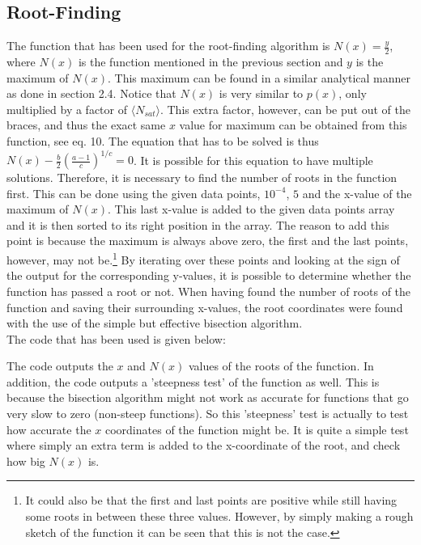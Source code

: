 \subsection{Root-Finding}

The function that has been used for the root-finding algorithm is $N(x) = \frac{y}{2}$, where $N(x)$ is the function mentioned in the previous section and $y$ is the maximum of $N(x)$. This maximum can be found in a similar analytical manner as done in section 2.4. Notice that $N(x)$ is very similar to $p(x)$, only multiplied by a factor of $\langle N_{sat} \rangle$. This extra factor, however, can be put out of the braces, and thus the exact same $x$ value for maximum can be obtained from this function, see eq. 10. The equation that has to be solved is thus $N(x) - \frac{b}{2} \left(\frac{a-1}{c}\right)^{1/c} = 0$. It is possible for this equation to have multiple solutions. Therefore, it is necessary to find the number of roots in the function first. This can be done using the given data points, $10^{-4}$, $5$ and the x-value of the maximum of $N(x)$. This last x-value is added to the given data points array and it is then sorted to its right position in the array. The reason to add this point is because the maximum is always above zero, the first and the last points, however, may not be.\footnote{It could also be that the first and last points are positive while still having some roots in between these three values. However, by simply making a rough sketch of the function it can be seen that this is not the case.} By iterating over these points and looking at the sign of the output for the corresponding y-values, it is possible to determine whether the function has passed a root or not.%
When having found the number of roots of the function and saving their surrounding x-values, the root coordinates were found with the use of the simple but effective bisection algorithm.\\
The code that has been used is given below:


The code outputs the $x$ and $N(x)$ values of the roots of the function. In addition, the code outputs a 'steepness test' of the function as well. This is because the bisection algorithm might not work as accurate for functions that go very slow to zero (non-steep functions). So this 'steepness' test is actually to test how accurate the $x$ coordinates of the function might be. It is quite a simple test where simply an extra term is added to the x-coordinate of the root, and check how big $N(x)$ is. 
